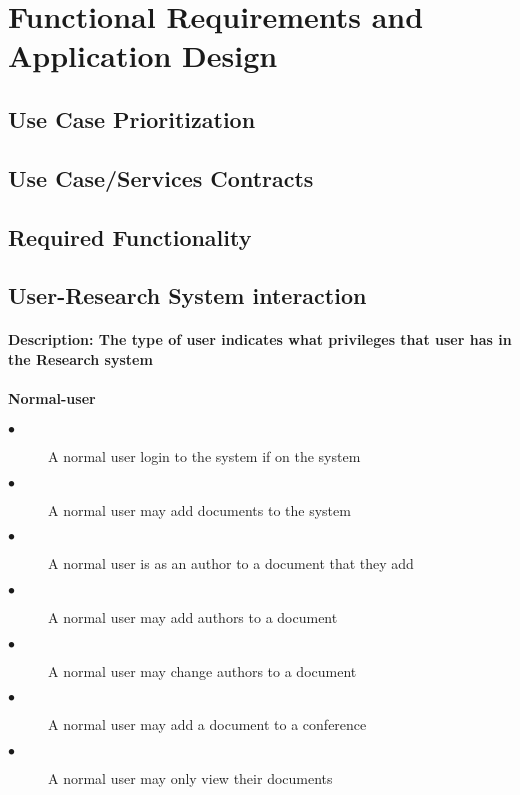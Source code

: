 \documentclass[a4paper]{article}
\begin{document}
\section{Functional Requirements and Application Design}

\subsection{Use Case Prioritization}

\subsection{Use Case/Services Contracts}

\subsection{Required Functionality}
\subsection{User-Research System interaction}
\paragraph{\textbf{Description:} The type of user indicates what privileges that user has in the Research system}
\paragraph{\textbf{Normal-user}}
\begin{description}
  \item[$\bullet$] A normal user login to the system if on the system
    \item[$\bullet$] A normal user may add documents to the system
    \item[$\bullet$] A normal user is as an author to a document that they add
    \item[$\bullet$] A normal user may add authors to a document
    \item[$\bullet$] A normal user may change authors to a document
    \item[$\bullet$] A normal user may add a document to a conference
    \item[$\bullet$] A normal user may only view their documents
\end{description}
\end{document}
